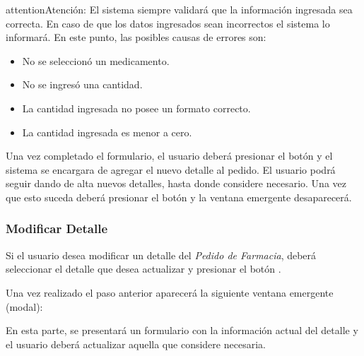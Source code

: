 \documentclass[a4paper,10pt,spanish]{sphinxmanual}
\begin{document}
\begin{notice}{attention}{Atención:}
El sistema siempre validará que la información ingresada sea correcta. En caso de que los datos ingresados sean incorrectos el sistema lo informará.
En este punto, las posibles causas de errores son:
\begin{itemize}
\item {} 
No se seleccionó un medicamento.

\item {} 
No se ingresó una cantidad.

\item {} 
La cantidad ingresada no posee un formato correcto.

\item {} 
La cantidad ingresada es menor a cero.

\end{itemize}
\end{notice}

Una vez completado el formulario, el usuario deberá presionar el botón  y el sistema se encargara de agregar el nuevo detalle al pedido.
El usuario podrá seguir dando de alta nuevos detalles, hasta donde considere necesario. Una vez que esto suceda deberá presionar el botón  y la ventana emergente desaparecerá.


\subsubsection{Modificar Detalle}
\label{pedidosfarmacia:modificar-detalle-pf}\label{pedidosfarmacia:modificar-detalle}
Si el usuario desea modificar un detalle del \emph{Pedido de Farmacia}, deberá seleccionar el detalle que desea actualizar y presionar el botón .


Una vez realizado el paso anterior aparecerá la siguiente ventana emergente (modal):


En esta parte, se presentará un formulario con la información actual del detalle y el usuario deberá actualizar aquella que considere necesaria.
\end{document}
